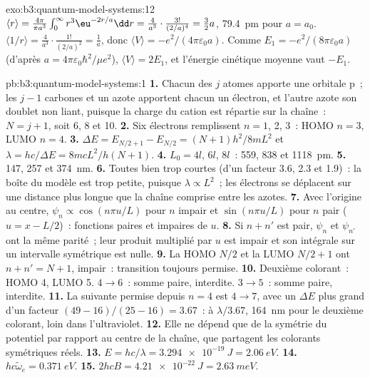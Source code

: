 \begin{solution}{exo:b3:quantum-model-systems:12}
$\langle r\rangle = \frac{4\pi}{\pi a^3}\int_0^\infty r^3\eu^{-2r/a}\dd r =
\frac{4}{a^3}\cdot\frac{3!}{(2/a)^4} = \frac32a$, \qty{79.4}{pm} pour $a = a_0$.
$\langle 1/r\rangle = \frac{4}{a^3}\cdot\frac{1!}{(2/a)^2} = \frac1a$, donc
$\langle V\rangle = -e^2/(4\pi\varepsilon_0a)$. Comme $E_1 =
-e^2/(8\pi\varepsilon_0a)$ (d'après $a = 4\pi\varepsilon_0\hbar^2/\mu e^2$),
$\langle V\rangle = 2E_1$, et l'énergie cinétique moyenne vaut $-E_1$.
\end{solution}

\begin{solution}{pb:b3:quantum-model-systems:1}
\textbf{1.} Chacun des $j$ atomes apporte une orbitale p~; les $j - 1$
carbones et un azote apportent chacun un électron, et l'autre azote son
doublet non liant, puisque la charge du cation est répartie sur la
chaîne~: $N = j + 1$, soit 6,
8 et 10.
\textbf{2.} Six électrons remplissent $n = 1$, 2, 3~: HOMO $n = 3$, LUMO $n = 4$.
\textbf{3.} $\Delta E = E_{N/2+1} - E_{N/2} = (N+1)h^2/8mL^2$ et $\lambda =
hc/\Delta E = 8mcL^2/h(N+1)$.
\textbf{4.} $L_0 = 4l$, $6l$, $8l$~: 559, 838 et \qty{1118}{pm}.
\textbf{5.} 147, 257 et \qty{374}{nm}.
\textbf{6.} Toutes bien trop courtes (d'un facteur 3.6, 2.3 et 1.9)~: la
boîte du modèle est trop petite, puisque $\lambda \propto L^2$~; les
électrons se déplacent sur une distance plus longue que la chaîne
comprise entre les azotes.
\textbf{7.} Avec l'origine au centre, $\psi_n \propto \cos(n\pi u/L)$ pour
$n$ impair et $\sin(n\pi u/L)$ pour $n$ pair ($u = x - L/2$)~: fonctions
paires et impaires de $u$.
\textbf{8.} Si $n + n'$ est pair, $\psi_n$ et $\psi_{n'}$ ont la même parité~;
leur produit multiplié par $u$ est impair et son intégrale sur un
intervalle symétrique est nulle.
\textbf{9.} La HOMO $N/2$ et la LUMO $N/2 + 1$ ont $n + n' = N + 1$,
impair~: transition toujours permise.
\textbf{10.} Deuxième colorant~: HOMO 4, LUMO 5. $4 \to 6$~: somme paire,
interdite. $3 \to 5$~: somme paire, interdite.
\textbf{11.} La suivante permise depuis $n = 4$ est $4 \to 7$, avec un
$\Delta E$ plus grand d'un facteur $(49 - 16)/(25 - 16) = 3.67$~: à $\lambda/3.67$,
\qty{164}{nm} pour le deuxième colorant, loin dans l'ultraviolet.
\textbf{12.} Elle ne dépend que de la symétrie du potentiel par rapport au
centre de la chaîne, que partagent les colorants symétriques réels.
\textbf{13.} $E = hc/\lambda = \qty{3.294e-19}{J} = \qty{2.06}{eV}$.
\textbf{14.} $hc\tilde\omega_e = \qty{0.371}{eV}$.
\textbf{15.} $2hcB = \qty{4.21e-22}{J} = \qty{2.63}{meV}$.

\end{solution}

